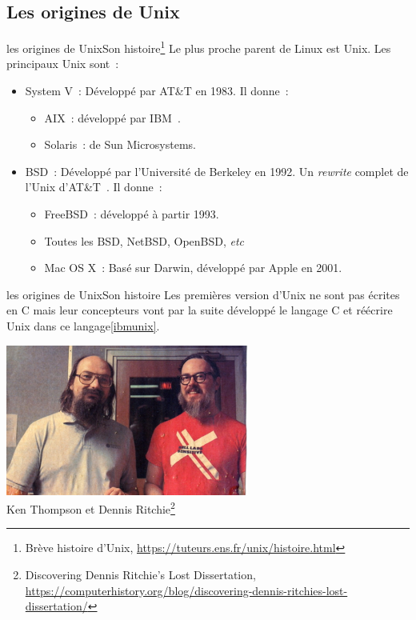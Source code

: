 \documentclass{beamer}
\begin{document}
    \subsection{Les origines de Unix}\label{subsec:unix-derivatives}
    \begin{frame}{les origines de Unix}{Son histoire\footnote{Brève histoire d'Unix, \url{https://tuteurs.ens.fr/unix/histoire.html}}}
        Le plus proche parent de Linux est Unix.
        Les principaux Unix sont~:
        \begin{itemize}
            \item System V~: Développé par AT\&T en 1983.
            Il donne~:
            \begin{itemize}
                \item AIX~: développé par IBM~.
                \item Solaris~: de Sun Microsystems.
            \end{itemize}
            \item BSD~: Développé par l'Université de Berkeley en 1992.
            Un \textit{rewrite} complet de l'Unix d'AT\&T~.
            Il donne~:
            \begin{itemize}
                \item FreeBSD~: développé à partir 1993.
                \item Toutes les BSD, NetBSD, OpenBSD, \textit{etc}
                \item Mac OS X~: Basé sur Darwin, développé par Apple en 2001.
            \end{itemize}
        \end{itemize}
    \end{frame}

    \begin{frame}{les origines de Unix}{Son histoire}
        Les premières version d'Unix ne sont pas écrites en C mais leur concepteurs vont par la suite développé le langage C et réécrire Unix dans ce langage\cref{ibmunix}.
        \begin{center}
            \includegraphics[width=8cm]{image/thompson-rithcie-bell} \\ Ken Thompson et Dennis Ritchie\footnote{Discovering Dennis Ritchie’s Lost Dissertation, \url{https://computerhistory.org/blog/discovering-dennis-ritchies-lost-dissertation/}} \\
        \end{center}
    \end{frame}
\end{document}
